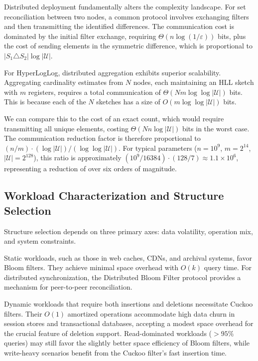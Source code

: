 Distributed deployment fundamentally alters the complexity landscape. For set reconciliation between two nodes, a common protocol involves exchanging filters and then transmitting the identified differences. The communication cost is dominated by the initial filter exchange, requiring $\Theta(n \log(1/\varepsilon))$ bits, plus the cost of sending elements in the symmetric difference, which is proportional to $|S_1 \triangle S_2| \log |\mathcal{U}|$.

For HyperLogLog, distributed aggregation exhibits superior scalability. Aggregating cardinality estimates from $N$ nodes, each maintaining an HLL sketch with $m$ registers, requires a total communication of $\Theta(Nm \log \log |\mathcal{U}|)$ bits. This is because each of the $N$ sketches has a size of $O(m \log \log |\mathcal{U}|)$ bits.

We can compare this to the cost of an exact count, which would require transmitting all unique elements, costing $\Theta(Nn \log |\mathcal{U}|)$ bits in the worst case. The communication reduction factor is therefore proportional to $(n/m) \cdot (\log |\mathcal{U}|)/(\log \log |\mathcal{U}|)$. For typical parameters ($n = 10^9$, $m = 2^{14}$, $|\mathcal{U}| = 2^{128}$), this ratio is approximately $(10^9/16384) \cdot (128/7) \approx 1.1 \times 10^6$, representing a reduction of over six orders of magnitude.

\subsection{Workload Characterization and Structure Selection}

Structure selection depends on three primary axes: data volatility, operation mix, and system constraints.

Static workloads, such as those in web caches, CDNs, and archival systems, favor Bloom filters. They achieve minimal space overhead with $O(k)$ query time. For distributed synchronization, the Distributed Bloom Filter protocol provides a mechanism for peer-to-peer reconciliation.

Dynamic workloads that require both insertions and deletions necessitate Cuckoo filters. Their $O(1)$ amortized operations accommodate high data churn in session stores and transactional databases, accepting a modest space overhead for the crucial feature of deletion support. Read-dominated workloads ($>95\%$ queries) may still favor the slightly better space efficiency of Bloom filters, while write-heavy scenarios benefit from the Cuckoo filter's fast insertion time.

